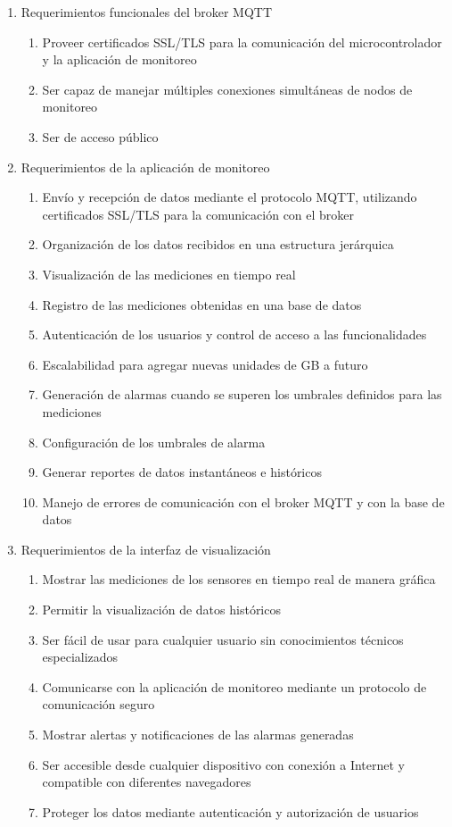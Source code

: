\documentclass[
11pt, %
]{charter}
\begin{document}
\begin{enumerate}
\begin{enumerate}
		\end{enumerate}
	\item Requerimientos funcionales del broker MQTT
		\begin{enumerate}
			\item Proveer certificados SSL/TLS para la comunicación del microcontrolador y la aplicación de monitoreo
			\item Ser capaz de manejar múltiples conexiones simultáneas de nodos de monitoreo
			\item Ser de acceso público
		\end{enumerate}
	\item Requerimientos de la aplicación de monitoreo
		\begin{enumerate}
			\item Envío y recepción de datos mediante el protocolo MQTT, utilizando certificados SSL/TLS para la comunicación con el broker
			\item Organización de los datos recibidos en una estructura jerárquica
			\item Visualización de las mediciones en tiempo real 
			\item Registro de las mediciones obtenidas en una base de datos
			\item Autenticación de los usuarios y control de acceso a las funcionalidades
			\item Escalabilidad para agregar nuevas unidades de GB a futuro
			\item Generación de alarmas cuando se superen los umbrales definidos para las mediciones
			\item Configuración de los umbrales de alarma
			\item Generar reportes de datos instantáneos e históricos
			\item Manejo de errores de comunicación con el broker MQTT y con la base de datos
		\end{enumerate}	
	\item Requerimientos de la interfaz de visualización
		\begin{enumerate}
			\item Mostrar las mediciones de los sensores en tiempo real de manera gráfica
			\item Permitir la visualización de datos históricos
			\item Ser fácil de usar para cualquier usuario sin conocimientos técnicos especializados
			\item Comunicarse con la aplicación de monitoreo mediante un protocolo de comunicación seguro 
			\item Mostrar alertas y notificaciones de las alarmas generadas
			\item Ser accesible desde cualquier dispositivo con conexión a Internet y compatible con diferentes navegadores
			\item Proteger los datos mediante autenticación y autorización de usuarios
			

\end{enumerate}
\end{enumerate}
\end{document}
